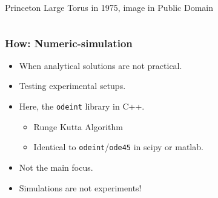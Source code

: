 \documentclass{beamer}
\begin{document}
\begin{frame}
\begin{columns}
\begin{column}{0.5\linewidth}
{{\color{gray} Princeton Large Torus in 1975, image in Public Domain}
}%
%
\end{column}
\end{columns}
\end{frame}


\begin{frame}
\frametitle{How: Numeric-simulation}
\begin{itemize}
\item<1-> When analytical solutions are not practical.
\item<2-> Testing experimental setups.
\item<4-> Here, the \lstinline{odeint} library in C++.
\begin{itemize}
\item<4-> Runge Kutta Algorithm
\item<4-> Identical to \lstinline{odeint}/\lstinline{ode45} in scipy or matlab.
\end{itemize}
\item<3-> Not the main focus.
\item<5-> Simulations are not experiments!
\end{itemize}
\end{frame}
\end{document}
